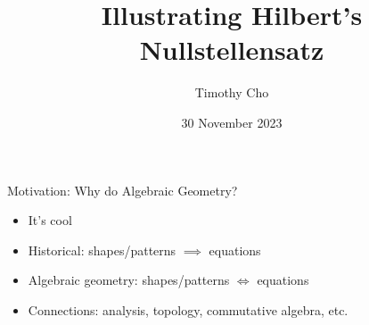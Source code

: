 \documentclass{beamer}
\title{Illustrating Hilbert's Nullstellensatz}
\author{Timothy Cho}
\institute{UC Irvine, MATH 195}
\date{30 November 2023}
\begin{document}
\maketitle
\begin{frame}{Motivation: Why do Algebraic Geometry?}
\pause
\begin{itemize}
    \item It's cool \pause
    \item Historical: shapes/patterns $\implies$ equations \pause
    \item Algebraic geometry: shapes/patterns $\iff$ equations \pause
    \item Connections: analysis, topology, commutative algebra, etc.
\end{itemize}
\end{frame}
\end{document}
